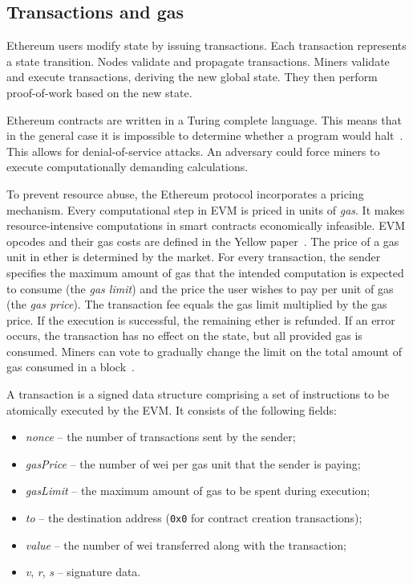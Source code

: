 \subsection{Transactions and gas}

Ethereum users modify state by issuing transactions.
Each transaction represents a state transition.
Nodes validate and propagate transactions.
Miners validate and execute transactions, deriving the new global state.
They then perform proof-of-work based on the new state.

Ethereum contracts are written in a Turing complete language.
This means that in the general case it is impossible to determine whether a program would halt~\cite{Church1936}.
This allows for denial-of-service attacks.
An adversary could force miners to execute computationally demanding calculations.

To prevent resource abuse, the Ethereum protocol incorporates a pricing mechanism.
Every computational step in EVM is priced in units of \emph{gas}.
It makes resource-intensive computations in smart contracts economically infeasible.
EVM opcodes and their gas costs are defined in the Yellow paper~\cite{Wood2014}.
The price of a gas unit in ether is determined by the market.
For every transaction, the sender specifies the maximum amount of gas that the intended computation is expected to consume (the \emph{gas limit}) and the price the user wishes to pay per unit of gas (the \emph{gas price}).
The transaction fee equals the gas limit multiplied by the gas price.
If the execution is successful, the remaining ether is refunded.
If an error occurs, the transaction has no effect on the state, but all provided gas is consumed.
Miners can vote to gradually change the limit on the total amount of gas consumed in a block~\cite{Jnnk15}.

A transaction is a signed data structure comprising a set of instructions to be atomically executed by the EVM.
It consists of the following fields:
\begin{itemize}
	\item \emph{nonce} -- the number of transactions sent by the sender;
	\item \emph{gasPrice} -- the number of wei per gas unit that the sender is paying;
	\item \emph{gasLimit} -- the maximum amount of gas to be spent during execution;
	\item \emph{to} -- the destination address (\texttt{0x0} for contract creation transactions);
	\item \emph{value} -- the number of wei transferred along with the transaction;
	\item \emph{v}, \emph{r}, \emph{s} -- signature data.
\end{itemize}

